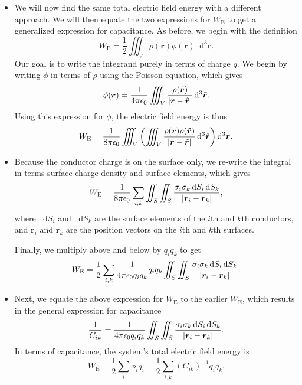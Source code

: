 \documentclass[11pt, a4paper]{article}
\newcommand{\diff}{\mathop{}\!\mathrm{d}} %
\newcommand{\dr}{\diff^{3} \r}  %
\newcommand{\dtr}{\diff^{3} \tilde{\r}}  %
\renewcommand{\vec}[1]{\bm{#1}} %
\renewcommand{\t}[1]{\tilde{#1}} %
\renewcommand{\r}{\vec{r}}
\newcommand{\ee}{\epsilon_{0}}  %
\begin{document}
\begin{itemize}
	\item We will now find the same total electric field energy with a different approach. We will then equate the two expressions for $ W_{\text{E}} $ to get a generalized expression for capacitance. As before, we begin with the definition
	\begin{equation*}
		W_{\text{E}} = \frac{1}{2}\iiint_{V} \rho(\r) \phi(\r) \dr.
	\end{equation*}
	Our goal is to write the integrand purely in terms of charge $ q $. We begin by writing $ \phi $ in terms of $ \rho $ using the Poisson equation, which gives
	\begin{equation*}
		\phi(\r) = \frac{1}{4\pi \ee}\iiint_{V}\frac{\rho(\t{\r})}{\abs{\r - \t{\r}}} \dtr.
	\end{equation*}
    Using this expression for $ \phi $, the electric field energy is thus
	\begin{equation*}
		W_{\text{E}} = \frac{1}{8\pi \ee} \iiint_{V}\left(\iiint_{V} \frac{\rho(\r)\rho(\t{\r})}{\abs{\r - \t{\r}}}\dtr \right) \dr.
	\end{equation*}
	
    \item Because the conductor charge is on the surface only, we re-write the integral in terms surface charge density and surface elements, which gives
	\begin{equation*}
		W_{\text{E}} = \frac{1}{8\pi \ee}\sum_{i, k} \iint_{S} \iint_{S} \frac{\sigma_{i}\sigma_{k}\diff S_{i}\diff S_{k}}{\abs{\r_{i} - \r_{k}}},
	\end{equation*}
	where $ \diff S_{i} $ and $ \diff S_{k} $ are the surface elements of the $ i $th and $ k $th conductors, and $ \r_{i} $ and $ \r_{k} $ are the position vectors on the $ i $th and $ k $th surfaces. 
	
	Finally, we multiply above and below by $ q_{i}q_{k} $ to get
	\begin{equation*}
		W_{\text{E}} = \frac{1}{2} \sum_{i, k} \frac{1}{4\pi \ee q_{i}q_{k}}q_{i}q_{k} \iint_{S} \iint_{S} \frac{\sigma_{i}\sigma_{k}\diff S_{i}\diff S_{k}}{\abs{\r_{i} - \r_{k}}}.
	\end{equation*}
	
	\item Next, we equate the above expression for $ W_{\text{E}} $ to the earlier $ W_{\text{E}} $, which results in the general expression for capacitance
	\begin{equation*}
		\frac{1}{C_{ik}} = \frac{1}{4\pi \ee q_{i} q_{k}} \iint_{S} \iint_{S} \frac{\sigma_{i}\sigma_{k}\diff S_{i}\diff S_{k}}{\abs{\r_{i} - \r_{k}}}.
	\end{equation*}
	In terms of capacitance, the system's total electric field energy is
	\begin{equation*}
		W_{\text{E}} = \frac{1}{2}\sum_{i}\phi_{i}q_{i} = \frac{1}{2}\sum_{i, k}(C_{ik})^{-1}q_{i}q_{k}.
	\end{equation*}


\end{itemize}
\end{document}
